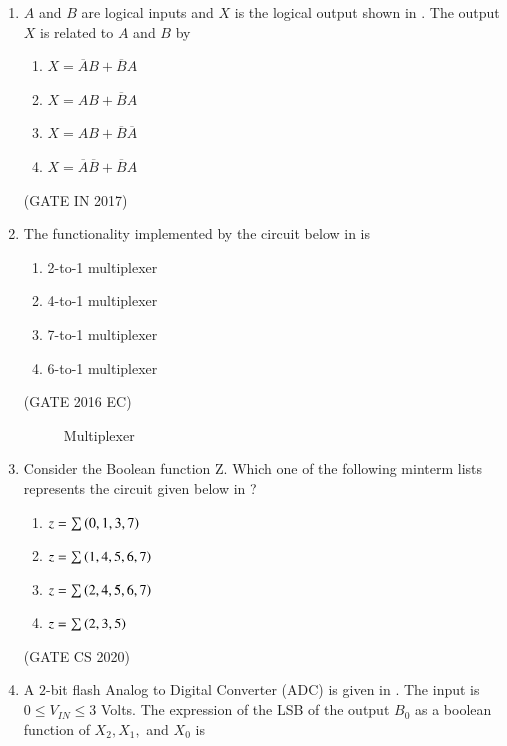 \begin{enumerate}[label=\arabic*.,ref=\theenumi]
\item $A$ and $B$ are logical inputs and $X$ is the logical output shown in 
.
	The output $X$ is related to $A$ and $B$ by 
\begin{enumerate}
\item $X = \overline{A}B + \overline{B}A$
\item $X = AB + \overline{B}A$
\item $X = AB + \overline{B}\overline{A}$
\item $X = \overline{A}\overline{B} + \overline{B}A$
\end{enumerate}
\hfill (GATE IN 2017)
\begin{figure}[H]
\centering
\resizebox{0.75\columnwidth}{!}{%

	}
\caption{}
\label{fig:gate_in_2017_30}
\end{figure}
\item The functionality implemented by the circuit below 
in
	is 
\begin{enumerate}
\item 2-to-1 multiplexer
\item 4-to-1 multiplexer
\item 7-to-1 multiplexer
\item 6-to-1 multiplexer
\end{enumerate}
\hfill (GATE 2016 EC)
%
\begin{figure}[H]
\centering
\resizebox{0.5\columnwidth}{!}{%

	}
\caption{Multiplexer}
\label{fig:gate_ec_2016_43}
\end{figure}
%
\item Consider the Boolean function Z. Which one of the following minterm lists represents the 
 circuit given below  
 in
	 ?
 \begin{figure}[H]
	 \centering
	 \resizebox{0.75\columnwidth}{!}{%

	 }
	 \caption{}
	 \label{fig:GATE CS 2020}
 \end{figure}
\begin{enumerate}[label=\Alph*.]
 \item $z=\sum{\ensuremath{\left(0,1,3,7\right)}}$
 \item $z=\sum{\ensuremath{\left(1,4,5,6,7\right)}}$
 \item $z=\sum{\ensuremath{\left(2,4,5,6,7\right)}}$
 \item $z=\sum{\ensuremath{\left(2,3,5\right)}}$
\end{enumerate}
\hfill (GATE CS 2020)
%
\item A $2$-bit flash Analog to Digital Converter (ADC) is given in . The input is $0 \leq V_{IN} \leq 3$ Volts. The expression of the LSB of the output $B_0$ as a boolean function of $X_2,X_1,$ and $X_0$ is 

\end{enumerate}
